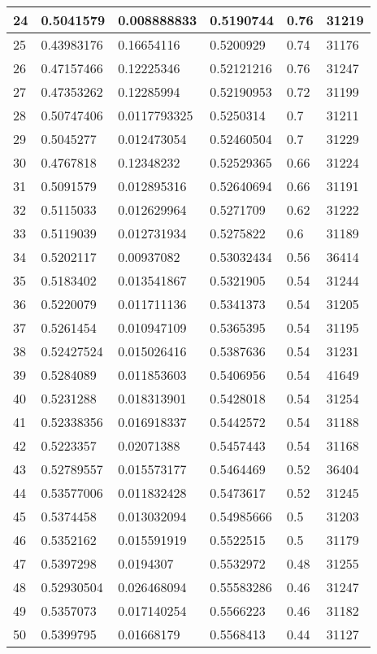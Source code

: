 \begin{longtable}{|l|l|l|l|l|l|}
24 & 0.5041579 & 0.008888833 & 0.5190744 & 0.76 & 31219 \\ \hline 
25 & 0.43983176 & 0.16654116 & 0.5200929 & 0.74 & 31176 \\ \hline 
26 & 0.47157466 & 0.12225346 & 0.52121216 & 0.76 & 31247 \\ \hline 
27 & 0.47353262 & 0.12285994 & 0.52190953 & 0.72 & 31199 \\ \hline 
28 & 0.50747406 & 0.0117793325 & 0.5250314 & 0.7 & 31211 \\ \hline 
29 & 0.5045277 & 0.012473054 & 0.52460504 & 0.7 & 31229 \\ \hline 
30 & 0.4767818 & 0.12348232 & 0.52529365 & 0.66 & 31224 \\ \hline 
31 & 0.5091579 & 0.012895316 & 0.52640694 & 0.66 & 31191 \\ \hline 
32 & 0.5115033 & 0.012629964 & 0.5271709 & 0.62 & 31222 \\ \hline 
33 & 0.5119039 & 0.012731934 & 0.5275822 & 0.6 & 31189 \\ \hline 
34 & 0.5202117 & 0.00937082 & 0.53032434 & 0.56 & 36414 \\ \hline 
35 & 0.5183402 & 0.013541867 & 0.5321905 & 0.54 & 31244 \\ \hline 
36 & 0.5220079 & 0.011711136 & 0.5341373 & 0.54 & 31205 \\ \hline 
37 & 0.5261454 & 0.010947109 & 0.5365395 & 0.54 & 31195 \\ \hline 
38 & 0.52427524 & 0.015026416 & 0.5387636 & 0.54 & 31231 \\ \hline 
39 & 0.5284089 & 0.011853603 & 0.5406956 & 0.54 & 41649 \\ \hline 
40 & 0.5231288 & 0.018313901 & 0.5428018 & 0.54 & 31254 \\ \hline 
41 & 0.52338356 & 0.016918337 & 0.5442572 & 0.54 & 31188 \\ \hline 
42 & 0.5223357 & 0.02071388 & 0.5457443 & 0.54 & 31168 \\ \hline 
43 & 0.52789557 & 0.015573177 & 0.5464469 & 0.52 & 36404 \\ \hline 
44 & 0.53577006 & 0.011832428 & 0.5473617 & 0.52 & 31245 \\ \hline 
45 & 0.5374458 & 0.013032094 & 0.54985666 & 0.5 & 31203 \\ \hline 
46 & 0.5352162 & 0.015591919 & 0.5522515 & 0.5 & 31179 \\ \hline 
47 & 0.5397298 & 0.0194307 & 0.5532972 & 0.48 & 31255 \\ \hline 
48 & 0.52930504 & 0.026468094 & 0.55583286 & 0.46 & 31247 \\ \hline 
49 & 0.5357073 & 0.017140254 & 0.5566223 & 0.46 & 31182 \\ \hline 
50 & 0.5399795 & 0.01668179 & 0.5568413 & 0.44 & 31127 \\ \hline 
\end{longtable}